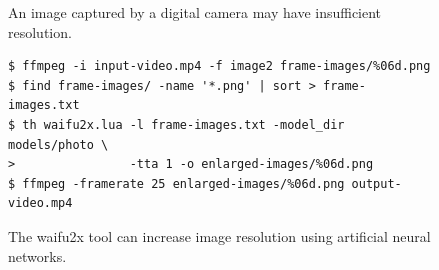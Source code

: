 \begingroup
{}%
\begin{subfigure}{\linewidth}

\vspace{-4pt}
\caption{An image captured by a digital camera may have insufficient resolution.}
\end{subfigure}
\begin{subfigure}{\linewidth}
\par\vspace{8.5pt}%
\begingroup
\small
\leavevmode\kern80pt
\begin{BVerbatim}
$ ffmpeg -i input-video.mp4 -f image2 frame-images/%06d.png
$ find frame-images/ -name '*.png' | sort > frame-images.txt
$ th waifu2x.lua -l frame-images.txt -model_dir models/photo \
>                -tta 1 -o enlarged-images/%06d.png
$ ffmpeg -framerate 25 enlarged-images/%06d.png output-video.mp4
\end{BVerbatim}
\par\vspace{2.5pt}%
\endgroup

\vspace{-4pt}
\caption{The waifu2x tool can increase image resolution using artificial neural networks.}
\end{subfigure}
\endgroup